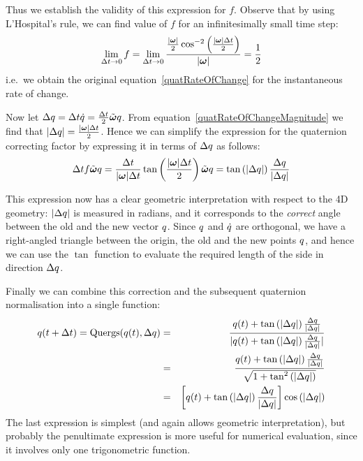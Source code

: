 Thus we establish the validity of this expression for $f$. Observe that by using 
L'Hospital's rule, we can find value of $f$ for an infinitesimally small time step:
$$
\lim_{\Delta t \to 0} f = \lim_{\Delta t \to 0} \frac{ \frac{\norm{\ve{\omega}}}{2}
    \cos^{-2}\left(\frac{\norm{\ve{\omega}}\Delta t}{2}\right) }{ \norm{\ve{\omega}} } =
    \frac{1}{2}
$$
i.e.\ we obtain the original equation~\ref{quatRateOfChange} for the
instantaneous rate of change.

Now let $\Delta \q{q} = \Delta t \dot{\q{q}} =
    \frac{\Delta t}{2} \tilde{\ve{\omega}} \q{q}$.
From equation~\ref{quatRateOfChangeMagnitude} we find that
$\norm{\Delta\q{q}} = \frac{\norm{\ve{\omega}}\Delta t}{2}$.
Hence we can simplify the expression for the quaternion correcting factor by expressing it
in terms of $\Delta q$ as follows:
$$
\Delta t f \tilde{\ve{\omega}}\q{q} = \frac{\Delta t}{\norm{\ve{\omega}}\Delta t}
    \tan\left(\frac{\norm{\ve{\omega}}\Delta t}{2}\right) \tilde{\ve{\omega}} \q{q} =
    \tan\left(\norm{\Delta\q{q}}\right) \frac{\Delta\q{q}}{\norm{\Delta\q{q}}}
$$

This expression now has a clear geometric interpretation with respect to the 4D geometry:
$|\Delta q|$ is measured in radians, and it corresponds to the \emph{correct}
angle between the old and the new vector $q$. Since $q$ and
$\dot{q}$ are orthogonal, we have a right-angled triangle between the origin,
the old and the new points $q$, and hence we can use the $\tan$ function to
evaluate the required length of the side in direction $\Delta q$.

Finally we can combine this correction and the subsequent quaternion normalisation into
a single function:
\begin{eqnarray*}
q(t+\Delta t) = \mathrm{Quergs}(q(t), \Delta q) &=&
    \frac{q(t) + \tan\left(|\Delta q|\right)
        \frac{\Delta q}{|\Delta q|}}{
    |q(t) + \tan\left(|\Delta q|\right)
        \frac{\Delta q}{|\Delta q|}|} \\
&=& \frac{q(t) + \tan\left(|\Delta q|\right)
        \frac{\Delta q}{|\Delta q|}}{
    \sqrt{1 + \tan^2\left(|\Delta q|\right)}} \\
&=& \left[q(t) + \tan\left(|\Delta q|\right)
        \frac{\Delta q}{|\Delta q|}\right]
    \cos\left(|\Delta q|\right)
\end{eqnarray*}
The last expression is simplest (and again allows geometric interpretation), but probably
the penultimate expression is more useful for numerical evaluation, since it involves only
one trigonometric function.
